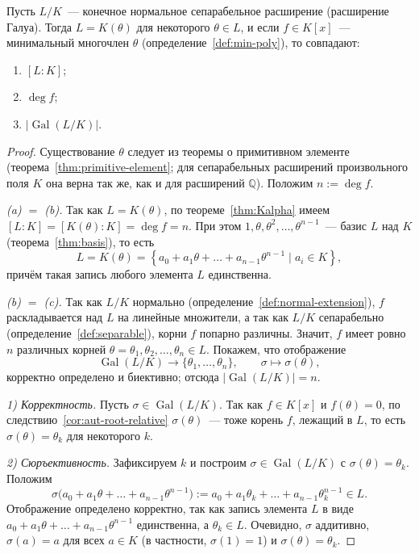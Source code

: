 \documentclass[12pt]{article}
\begin{document}
	\begin{theorem}\label{thm:galois-order}
		Пусть $L/K$~--- конечное нормальное сепарабельное расширение (расширение Галуа). Тогда $L = K(\theta)$ для некоторого $\theta \in L$, и если $f \in K[x]$~--- минимальный многочлен $\theta$ (определение~\ref{def:min-poly}), то совпадают:
		\begin{enumerate}
			\item[(a)] $[L : K]$;
			\item[(b)] $\deg f$;
			\item[(c)] $\left| \operatorname{Gal}(L/K) \right|$.
		\end{enumerate}
	\end{theorem}
	\begin{proof}
		Существование $\theta$ следует из теоремы о примитивном элементе (теорема~\ref{thm:primitive-element}; для сепарабельных расширений произвольного поля $K$ она верна так же, как и для расширений $\mathbb{Q}$). Положим $n := \deg f$.

		\emph{(a) $=$ (b).} Так как $L = K(\theta)$, по теореме~\ref{thm:Kalpha} имеем $[L:K] = [K(\theta):K] = \deg f = n$. При этом $1, \theta, \theta^2, \ldots, \theta^{n-1}$~--- базис $L$ над $K$ (теорема~\ref{thm:basis}), то есть
		\[
			L = K(\theta) = \left\{ a_0 + a_1\theta + \ldots + a_{n-1}\theta^{n-1} \mid a_i \in K \right\},
		\]
		причём такая запись любого элемента $L$ единственна.

		\emph{(b) $=$ (c).} Так как $L/K$ нормально (определение~\ref{def:normal-extension}), $f$ раскладывается над $L$ на линейные множители, а так как $L/K$ сепарабельно (определение~\ref{def:separable}), корни $f$ попарно различны. Значит, $f$ имеет ровно $n$ различных корней $\theta = \theta_1, \theta_2, \ldots, \theta_n \in L$. Покажем, что отображение
		\[
			\operatorname{Gal}(L/K) \to \{ \theta_1, \ldots, \theta_n \}, \qquad \sigma \mapsto \sigma(\theta),
		\]
		корректно определено и биективно; отсюда $|\operatorname{Gal}(L/K)| = n$.

		\emph{1) Корректность.} Пусть $\sigma \in \operatorname{Gal}(L/K)$. Так как $f \in K[x]$ и $f(\theta)=0$, по следствию~\ref{cor:aut-root-relative} $\sigma(\theta)$~--- тоже корень $f$, лежащий в $L$, то есть $\sigma(\theta) = \theta_k$ для некоторого $k$.

		\emph{2) Сюръективность.} Зафиксируем $k$ и построим $\sigma \in \operatorname{Gal}(L/K)$ с $\sigma(\theta) = \theta_k$. Положим
		\[
			\sigma\bigl( a_0 + a_1\theta + \ldots + a_{n-1}\theta^{n-1} \bigr) := a_0 + a_1\theta_k + \ldots + a_{n-1}\theta_k^{n-1} \in L.
		\]
		Отображение определено корректно, так как запись элемента $L$ в виде $a_0 + a_1\theta + \ldots + a_{n-1}\theta^{n-1}$ единственна, а $\theta_k \in L$. Очевидно, $\sigma$ аддитивно, $\sigma(a)=a$ для всех $a \in K$ (в частности, $\sigma(1)=1$) и $\sigma(\theta)=\theta_k$.


\end{proof}
\end{document}
